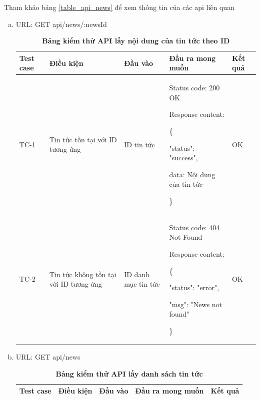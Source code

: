 Tham khảo bảng \ref{table_api_news} để xem thông tin của các api liên quan
\newpage
\begin{enumerate}[a)]
  \item URL: GET api/news/{:newsId}
  
  \begin{xltabular}{\textwidth}{
    | >{\raggedright\arraybackslash}p{1cm}
    | >{\raggedright\arraybackslash}p{2cm}
    | >{\raggedright\arraybackslash}p{2cm}
    | >{\raggedright\arraybackslash}X
    | >{\raggedright\arraybackslash}p{1cm}|
    }
    \caption{\bfseries \fontsize{12pt}{0pt}\selectfont Bảng kiểm thử API lấy nội dung của tin tức theo ID}
    \\
    \hline
    \bfseries Test case    &\bfseries Điều kiện   &\bfseries Đầu vào 
    &\bfseries Đầu ra mong muốn &\bfseries Kết quả\\ \hline
  
  
    TC-1
    & Tin tức tồn tại với ID tương ứng
    & ID tin tức
    & 
  
    Status code: 200 OK
  
      Response content:
  
      \{
  
    "status": "success",

    data: Nội dung của tin tức
  
    \}
    
    & OK
  
    \\ \hline
  
    TC-2
    & Tin tức không tồn tại với ID tương ứng
    & ID danh mục tin tức
   &
  
    Status code: 404 Not Found
  
      Response content:
  
      \{
  
    "status": "error",
  
    "msg": "News not found"
  
    \}
    
    & OK
  
    \\ \hline

  
    \end{xltabular}

  \item URL: GET api/news

  \begin{xltabular}{\textwidth}{
    | >{\raggedright\arraybackslash}p{1cm}
    | >{\raggedright\arraybackslash}p{1cm}
    | >{\raggedright\arraybackslash}p{1.5cm}
    | >{\raggedright\arraybackslash}X
    | >{\raggedright\arraybackslash}p{1cm}|
    }
    \caption{\bfseries \fontsize{12pt}{0pt}\selectfont Bảng kiểm thử API lấy danh sách tin tức}
    \\
    \hline
    \bfseries Test case    &\bfseries Điều kiện   &\bfseries Đầu vào 
    &\bfseries Đầu ra mong muốn &\bfseries Kết quả\\ \hline
  

\end{xltabular}
\end{enumerate}

